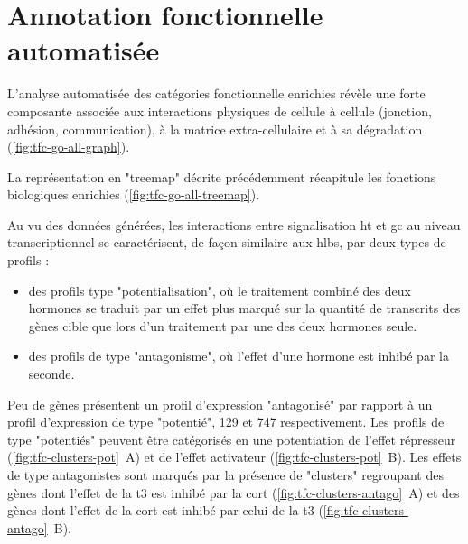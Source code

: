 \documentclass[../main.tex]{subfiles}
\begin{document}


\section{Annotation fonctionnelle automatisée}

L'analyse automatisée des catégories fonctionnelle enrichies révèle une forte composante associée aux interactions physiques de cellule à cellule (jonction, adhésion, communication), à la matrice extra-cellulaire et à sa dégradation (\autoref{fig:tfc-go-all-graph}).



La représentation en "treemap" décrite précédemment récapitule les fonctions biologiques enrichies (\autoref{fig:tfc-go-all-treemap}).



Au vu des données générées, les interactions entre signalisation \gls{ht} et \gls{gc} au niveau transcriptionnel se caractérisent, de façon similaire aux \glspl{hlb}, par deux types de profils :
\begin{itemize}
\item des profils type "potentialisation", où le traitement combiné des deux hormones se traduit par un effet plus marqué sur la quantité de transcrits des gènes cible que lors d'un traitement par une des deux hormones seule.
\item des profils de type "antagonisme", où l'effet d'une hormone est inhibé par la seconde.
\end{itemize}

Peu de gènes présentent un profil d'expression "antagonisé" par rapport à un profil d'expression de type "potentié", 129 et 747 respectivement.
Les profils de type "potentiés" peuvent être catégorisés en une potentiation de l'effet répresseur (\autoref{fig:tfc-clusters-pot}~A) et de l'effet activateur (\autoref{fig:tfc-clusters-pot}~B).
Les effets de type antagonistes sont marqués par la présence de "clusters" regroupant des gènes dont l'effet de la \gls{t3} est inhibé par la \gls{cort} (\autoref{fig:tfc-clusters-antago}~A) et des gènes dont l'effet de la \gls{cort} est inhibé par celui de la \gls{t3} (\autoref{fig:tfc-clusters-antago}~B).


\end{document}

